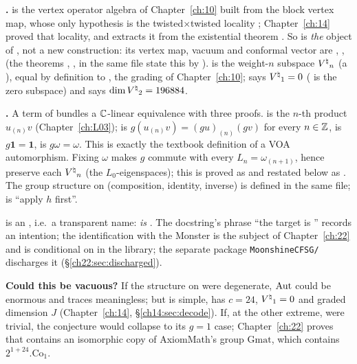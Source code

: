 \begin{dictionary}
\textbf{.}   is the vertex operator algebra of Chapter~\ref{ch:10} built from the
block vertex map, whose only hypothesis is the twisted$\times$twisted locality ; Chapter~\ref{ch:14}
proved that locality, and  extracts it from the existential theorem
.  So  is \emph{the} object of , not a new construction: its vertex map,
vacuum and conformal vector are , ,  (the theorems
, ,  in the same file state this by ).
 is the weight-$n$ subspace ${V^{\natural}}_n$ (a ), equal by definition to
, the grading of Chapter~\ref{ch:10};  says ${V^{\natural}}_1=0$ ( is
the zero subspace) and  says $\dim{V^{\natural}}_2=196884$.

\textbf{.}  A term of  bundles a ${\mathbb{C}}$-linear equivalence  with three
proofs.   is the $n$-th product $u_{(n)}v$ (Chapter~\ref{ch:L03});  is
$g(u_{(n)}v)=(gu)_{(n)}(gv)$ for every $n\in{\mathbb{Z}}$,  is $g\mathbf 1=\mathbf 1$,  is
$g\omega=\omega$.  This is exactly the textbook definition of a VOA automorphism.  Fixing $\omega$ makes $g$ commute
with every $L_n=\omega_{(n+1)}$, hence preserve each ${V^{\natural}}_n$ (the $L_0$-eigenspaces); this is proved as
 and restated below as .  The group structure on
 (composition, identity, inverse) is defined in the same file;  is ``apply $h$ first''.

\textbf{} is an , i.e.\ a transparent name:  \emph{is} .
The docstring's phrase ``the target is '' records an intention; the identification with
the Monster is the subject of Chapter~\ref{ch:22} and is conditional on  in the library;
the separate package \texttt{MoonshineCFSG/} discharges it (\S\ref{ch22:sec:discharged}).

\textbf{Could this be vacuous?}  If the structure on  were degenerate, $\operatorname{Aut}$ could be enormous and
traces meaningless; but  is simple, has $c=24$, ${V^{\natural}}_1=0$ and graded dimension $J$
(Chapter~\ref{ch:14}, \S\ref{ch14:sec:decode}).  If, at the other extreme,  were trivial, the
conjecture would collapse to its $g=1$ case; Chapter~\ref{ch:22} proves that  contains an isomorphic
copy of AxiomMath's group $\mathrm{Gmat}$, which contains $2^{1+24}.\mathrm{Co}_1$.
\end{dictionary}
